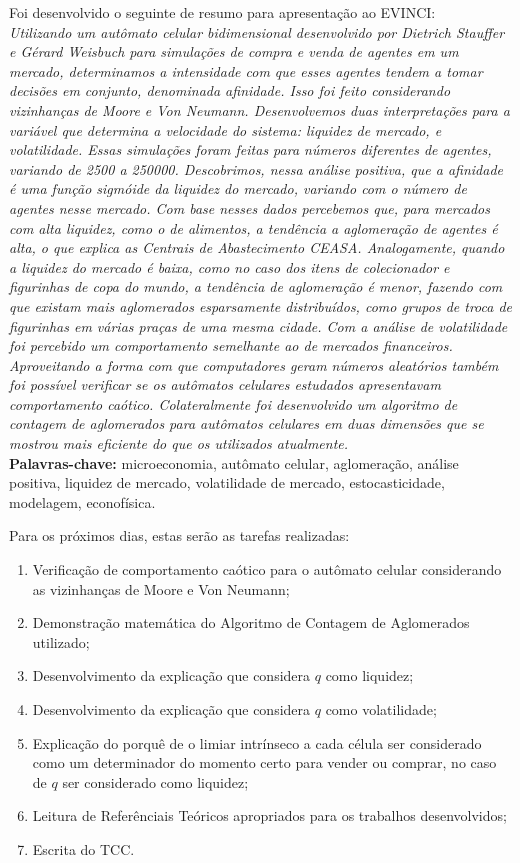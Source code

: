 \documentclass[12pt,a4paper,final]{article}
\begin{document}
  Foi desenvolvido o seguinte de resumo para apresentação ao EVINCI:\\
  \textit{Utilizando um autômato celular bidimensional desenvolvido por Dietrich Stauffer e Gérard Weisbuch para simulações de compra e venda de agentes em um mercado, determinamos a intensidade com que esses agentes tendem a tomar decisões em conjunto, denominada afinidade. Isso foi feito considerando vizinhanças de Moore e Von Neumann. Desenvolvemos duas interpretações para a variável que determina a velocidade do sistema: liquidez de mercado, e volatilidade. Essas simulações foram feitas para números diferentes de agentes, variando de 2500 a 250000. Descobrimos, nessa análise positiva, que a afinidade é uma função sigmóide da liquidez do mercado, variando com o número de agentes nesse mercado. Com base nesses dados percebemos que, para mercados com alta liquidez, como o de alimentos, a tendência a aglomeração de agentes é alta, o que explica as Centrais de Abastecimento CEASA. Analogamente, quando a liquidez do mercado é baixa, como no caso dos itens de colecionador e figurinhas de copa do mundo, a tendência de aglomeração é menor, fazendo com que existam mais aglomerados esparsamente distribuídos, como grupos de troca de figurinhas em várias praças de uma mesma cidade. Com a análise de volatilidade foi percebido um comportamento semelhante ao de mercados financeiros. Aproveitando a forma com que computadores geram números aleatórios também foi possível verificar se os autômatos celulares estudados apresentavam comportamento caótico. Colateralmente foi desenvolvido um algoritmo de contagem de aglomerados para autômatos celulares em duas dimensões que se mostrou mais eficiente do que os utilizados atualmente.}\\ \textbf{Palavras-chave:} microeconomia, autômato celular, aglomeração, análise positiva, liquidez de mercado, volatilidade de mercado, estocasticidade, modelagem, econofísica.

  Para os próximos dias, estas serão as tarefas realizadas:
  \begin{enumerate}
    \item Verificação de comportamento caótico para o autômato celular considerando as vizinhanças de Moore e Von Neumann;
    \item Demonstração matemática do Algoritmo de Contagem de Aglomerados utilizado;
    \item Desenvolvimento da explicação que considera $q$ como liquidez;
    \item Desenvolvimento da explicação que considera $q$ como volatilidade;
    \item Explicação do porquê de o limiar intrínseco a cada célula ser considerado como um determinador do momento certo para vender ou comprar, no caso de $q$ ser considerado como liquidez;
    \item Leitura de Referênciais Teóricos apropriados para os trabalhos desenvolvidos;
    \item Escrita do TCC.
	\end{enumerate}
\end{document}
